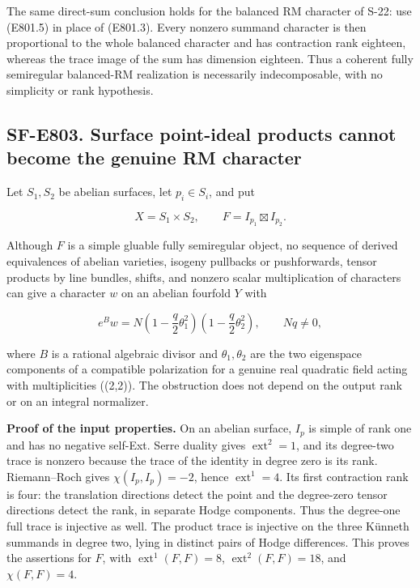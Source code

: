 The same direct-sum conclusion holds for the balanced RM character of
S-22: use (E801.5) in place of (E801.3). Every nonzero summand character
is then proportional to the whole balanced character and has contraction
rank eighteen, whereas the trace image of the sum has dimension
eighteen. Thus a coherent fully semiregular balanced-RM realization is
necessarily indecomposable, with no simplicity or rank hypothesis.

\subsection{SF-E803. Surface point-ideal products cannot become the
genuine RM
character}\label{SF-E803}

Let \(S_1,S_2\) be abelian surfaces, let \(p_i\in S_i\), and put

\[
 X=S_1\times S_2,
 \qquad F=I_{p_1}\boxtimes I_{p_2}.
\]

Although \(F\) is a simple gluable fully semiregular object, no sequence
of derived equivalences of abelian varieties, isogeny pullbacks or
pushforwards, tensor products by line bundles, shifts, and nonzero
scalar multiplication of characters can give a character \(w\) on an
abelian fourfold \(Y\) with

\[
 e^B w=N\left(1-\frac q2\theta_1^2\right)
          \left(1-\frac q2\theta_2^2\right),
 \qquad Nq\ne0,
 \tag{E803.1}
\]

where \(B\) is a rational algebraic divisor and \(\theta_1,\theta_2\)
are the two eigenspace components of a compatible polarization for a
genuine real quadratic field acting with multiplicities ((2,2)). The
obstruction does not depend on the output rank or on an integral
normalizer.

\textbf{Proof of the input properties.} On an abelian surface, \(I_p\)
is simple of rank one and has no negative self-Ext. Serre duality gives
\(\operatorname{ext}^2=1\), and its degree-two trace is nonzero because
the trace of the identity in degree zero is its rank. Riemann--Roch
gives \(\chi(I_p,I_p)=-2\), hence \(\operatorname{ext}^1=4\). Its first
contraction rank is four: the translation directions detect the point
and the degree-zero tensor directions detect the rank, in separate Hodge
components. Thus the degree-one full trace is injective as well. The
product trace is injective on the three Künneth summands in degree two,
lying in distinct pairs of Hodge differences. This proves the assertions
for \(F\), with \(\operatorname{ext}^1(F,F)=8\),
\(\operatorname{ext}^2(F,F)=18\), and \(\chi(F,F)=4\).

